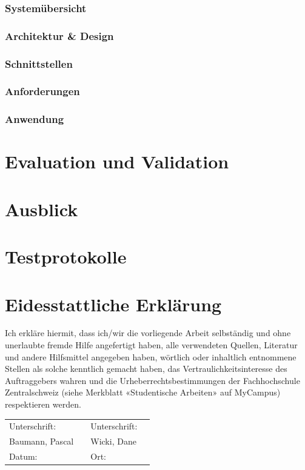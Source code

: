 \documentclass[a4paper]{scrreprt}
\begin{document}
\subsection{Systemübersicht}

\subsection{Architektur \& Design}

\subsection{Schnittstellen}

\subsection{Anforderungen}

\subsection{Anwendung}

\chapter{Evaluation und Validation}




\chapter{Ausblick}

\appendix

\chapter{Testprotokolle}



\listoffigures

\listoftables

\listofmyequations \pagebreak

\printbibliography

\chapter*{Eidesstattliche Erklärung}
Ich erkläre hiermit, dass ich/wir die vorliegende Arbeit selbständig und ohne unerlaubte fremde Hilfe angefertigt haben, alle verwendeten Quellen, Literatur und andere Hilfsmittel angegeben haben, wörtlich oder inhaltlich entnommene Stellen als solche kenntlich gemacht haben, das Vertraulichkeitsinteresse des Auftraggebers wahren und die Urheberrechtsbestimmungen der Fachhochschule Zentralschweiz (siehe Merkblatt «Studentische Arbeiten» auf MyCampus) respektieren werden.

\vspace{1em}

\renewcommand{\arraystretch}{2}
\begin{tabularx}{\textwidth}{XXXX}
	Unterschrift: & & Unterschrift: & \\ \cline{2-2}\cline{4-4}
	Baumann, Pascal & & Wicki, Dane & \\
	Datum: & & Ort: & \\
\end{tabularx}
\end{document}
